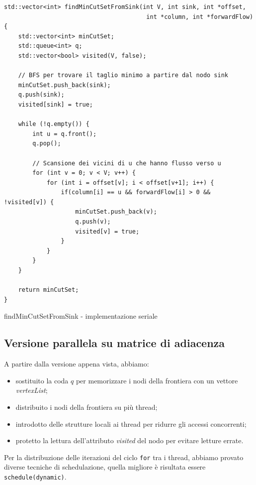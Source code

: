             \begin{listing}[ht]
            \begin{verbatim}
std::vector<int> findMinCutSetFromSink(int V, int sink, int *offset, 
                                        int *column, int *forwardFlow){
    std::vector<int> minCutSet;
    std::queue<int> q;
    std::vector<bool> visited(V, false);

    // BFS per trovare il taglio minimo a partire dal nodo sink
    minCutSet.push_back(sink);
    q.push(sink);
    visited[sink] = true;

    while (!q.empty()) {
        int u = q.front();
        q.pop();

        // Scansione dei vicini di u che hanno flusso verso u
        for (int v = 0; v < V; v++) {
            for (int i = offset[v]; i < offset[v+1]; i++) {
                if(column[i] == u && forwardFlow[i] > 0 && !visited[v]) {
                    minCutSet.push_back(v);
                    q.push(v);
                    visited[v] = true;
                }
            }    
        }
    }

    return minCutSet;
}
            \end{verbatim}
            \caption{findMinCutSetFromSink - implementazione seriale}\label{code:mincut-serial}
            \end{listing}

        \subsection{Versione parallela su matrice di adiacenza}

            A partire dalla versione appena vista, abbiamo:
            \begin{itemize}
                \item sostituito la coda $q$ per memorizzare i nodi della frontiera con un vettore \textit{vertexList};
                \item distribuito i nodi della frontiera su più thread;
                \item introdotto delle strutture locali ai thread per ridurre gli accessi concorrenti;
                \item protetto la lettura dell'attributo \textit{visited} del nodo per evitare letture errate.
            \end{itemize}

            Per la distribuzione delle iterazioni del ciclo \verb|for| tra i thread, abbiamo provato diverse tecniche di schedulazione, quella migliore è risultata essere \verb|schedule(dynamic)|.

